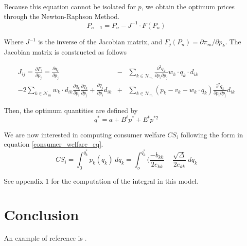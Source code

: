 \documentclass[12pt]{article}
\begin{document}
Because this equation cannot be isolated for $p$, we obtain the optimum prices through the Newton-Raphson Method.
\begin{equation*}
P_{n+1} = P_n - J^{-1} \cdot F(P_n)
\end{equation*}

Where $J^{-1}$ is the inverse of the Jacobian matrix, and $F_j(P_n) = \partial \pi_m / \partial p_k$. The Jacobian matrix is constructed as follows

\begin{eqnarray*}
J_{ij} = \frac{\partial F_i}{\partial p_j} = \frac{\partial q_i}{\partial p_j} &-& \sum_{k \in \mathcal{N}_m} \frac{\partial^2 q_k}{\partial p_i \partial p_j} w_k \cdot q_k \cdot d_{ik}\\
 - 2\sum_{k \in \mathcal{N}_m} w_k \cdot d_{ik} \frac{\partial q_k}{\partial p_i} \frac{\partial q_k}{\partial p_j} + \frac{\partial q_j}{\partial p_i} d_{ik} &+& \sum_{k \in \mathcal{N}_m} (p_k - v_k - w_k \cdot q_k) \frac{\partial^2 q_k}{\partial p_i \partial p_j}d_{ik}
\end{eqnarray*}

Then, the optimum quantities are defined by 
\begin{equation*}
q^* = a + B^t p^* + E^t p^{*2}
\end{equation*}

We are now interested in computing consumer welfare $CS_i$ following the form in equation \ref{consumer_welfare_eq}.
\begin{equation*}
CS_i = \int_0^{q_k^*} p_k(q_k) \ dq_k = \int_o^{q_k^*} (\frac{-b_{kk}}{2e_{kk}} - \frac{\sqrt{\Delta}}{2e_{kk}} \ dq_k
\end{equation*}

See appendix 1 for the computation of the integral in this model.  

\section{Conclusion}

An example of reference is \cite{abc}.
\end{document}
